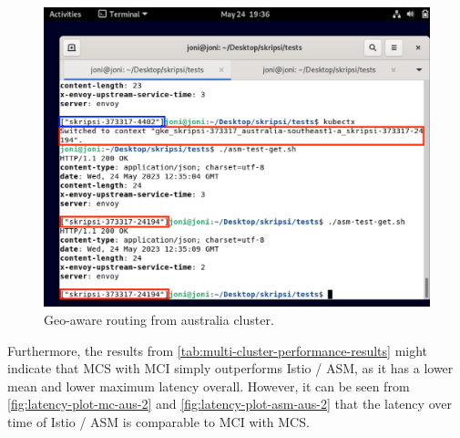 \begin{figure}
	\centering
	\includegraphics[width=1\textwidth]{assets/pics/5-aus-locality.png}
	\caption{Geo-aware routing from australia cluster.}
	\label{fig:5-aus-locality}
\end{figure}

Furthermore, the results from \autoref{tab:multi-cluster-performance-results} might indicate that MCS with MCI simply outperforms Istio / ASM, as it has a lower mean and lower maximum latency overall. However, it can be seen from \autoref{fig:latency-plot-mc-aus-2} and \autoref{fig:latency-plot-asm-aus-2} that the latency over time of Istio / ASM is comparable to MCI with MCS.






